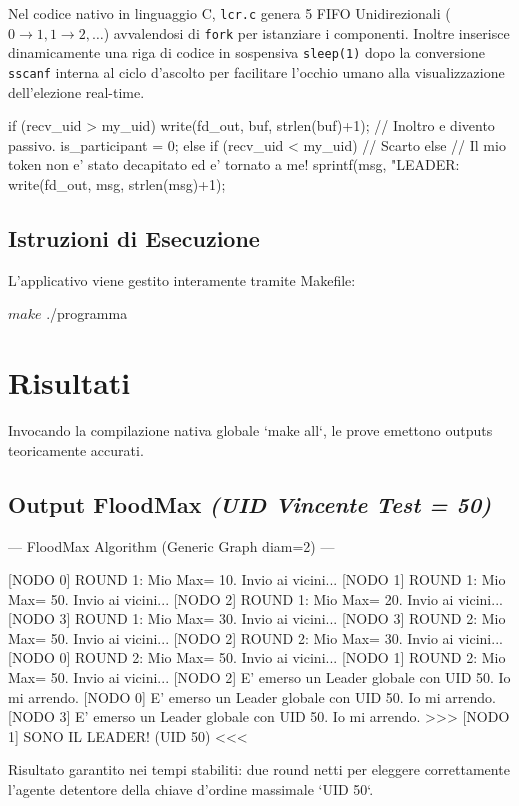 \documentclass[a4paper,12pt]{article}
\begin{document}
Nel codice nativo in linguaggio C, \texttt{lcr.c} genera 5 FIFO Unidirezionali ($0 \rightarrow 1, 1 \rightarrow 2, \dots$) avvalendosi di \texttt{fork} per istanziare i componenti. Inoltre inserisce dinamicamente una riga di codice in sospensiva \texttt{sleep(1)} dopo la conversione \texttt{sscanf} interna al ciclo d'ascolto per facilitare l'occhio umano alla visualizzazione dell'elezione real-time.

\begin{ccode}
if (recv_uid > my_uid) {
    write(fd_out, buf, strlen(buf)+1); // Inoltro e divento passivo.
    is_participant = 0;
} else if (recv_uid < my_uid) {
    // Scarto
} else {
    // Il mio token non e' stato decapitato ed e' tornato a me!
    sprintf(msg, "LEADER:%
    write(fd_out, msg, strlen(msg)+1);
}
\end{ccode}


\subsection{Istruzioni di Esecuzione}
L'applicativo viene gestito interamente tramite Makefile:
\begin{terminal}
$ make
$ ./programma
\end{terminal}

\section{Risultati}
Invocando la compilazione nativa globale `make all`, le prove emettono outputs teoricamente accurati.

\subsection{Output FloodMax \textit{(UID Vincente Test = 50)}}
\begin{terminal}
--- FloodMax Algorithm (Generic Graph diam=2) ---

[NODO 0] ROUND 1: Mio Max= 10. Invio ai vicini...
[NODO 1] ROUND 1: Mio Max= 50. Invio ai vicini...
[NODO 2] ROUND 1: Mio Max= 20. Invio ai vicini...
[NODO 3] ROUND 1: Mio Max= 30. Invio ai vicini...
[NODO 3] ROUND 2: Mio Max= 50. Invio ai vicini...
[NODO 2] ROUND 2: Mio Max= 30. Invio ai vicini...
[NODO 0] ROUND 2: Mio Max= 50. Invio ai vicini...
[NODO 1] ROUND 2: Mio Max= 50. Invio ai vicini...
[NODO 2] E' emerso un Leader globale con UID 50. Io mi arrendo.
[NODO 0] E' emerso un Leader globale con UID 50. Io mi arrendo.
[NODO 3] E' emerso un Leader globale con UID 50. Io mi arrendo.
>>> [NODO 1] SONO IL LEADER! (UID 50) <<<
\end{terminal}
Risultato garantito nei tempi stabiliti: due round netti per eleggere correttamente l'agente detentore della chiave d'ordine massimale `UID 50`.
\end{document}
